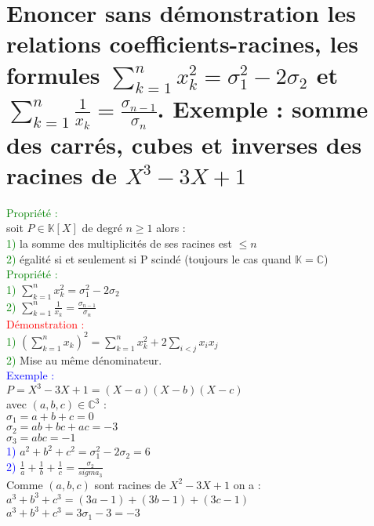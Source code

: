 \documentclass{article}
\begin{document}
\section{Enoncer sans démonstration les relations coefficients-racines, les formules $\sum_{k=1}^n x_k^2= \sigma_1^2-2 \sigma_2$ et $\sum_{k=1}^n \frac{1}{x_k}=\frac{\sigma_{n-1}}{\sigma_{n}}$. Exemple : somme des carrés, cubes et inverses des racines de $X^3-3X+1$}
\textcolor{green}{Propriété :} \\
soit $P \in \mathbb K [X]$ de degré $n \geq 1$ alors : \\
\textcolor{green}{1)} la somme des multiplicités de ses racines est $\leq n$ \\
\textcolor{green}{2)} égalité si et seulement si P scindé (toujours le cas quand $\mathbb K = \mathbb C$) \\
\textcolor{green}{Propriété :} \\
\textcolor{green}{1)} $\sum_{k=1}^n x_k^2= \sigma_1^2-2 \sigma_2$ \\
\textcolor{green}{2)} $\sum_{k=1}^n \frac{1}{x_k}=\frac{\sigma_{n-1}}{\sigma_{n}}$ \\
\textcolor{red}{Démonstration :} \\
\textcolor{green}{1)} $(\sum_{k=1}^n x_k)^2= \sum_{k=1}^n x_k^2+ 2 \sum_{i<j}x_ix_j$ \\
\textcolor{green}{2)} Mise au même dénominateur. \\
\textcolor{blue}{Exemple :} \\
$P=X^3-3X+1=(X-a)(X-b)(X-c)$ \\
avec $(a,b,c) \in \mathbb C^3$ : \\
$\sigma_1=a+b+c=0$ \\
$\sigma_2=ab+bc+ac=-3$ \\
$\sigma_3=abc=-1$ \\
\textcolor{blue}{1)} $a^2+b^2+c^2= \sigma_1^2-2\sigma_2=6$ \\
\textcolor{blue}{2)} $\frac{1}{a}+ \frac{1}{b} + \frac{1}{c}= \frac{\sigma_2}{sigma_3}$ \\
Comme $(a,b,c)$ sont racines de $X^2-3X+1$ on a : \\
$a^3+b^3+c^3=(3a-1)+(3b-1)+(3c-1)$ \\
$a^3+b^3+c^3=3 \sigma_1 -3 =-3$
\end{document}
